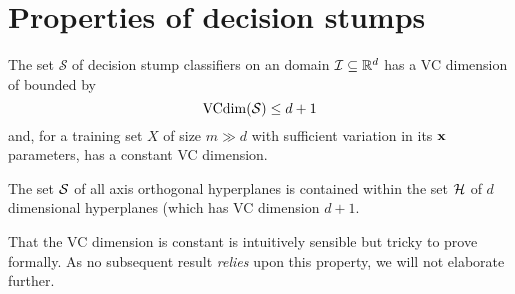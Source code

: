 \section{Properties of decision stumps}

\begin{theorem}
\label{theorem:vcdim stumps}
The set $\mathcal{S}$ of decision stump classifiers on an domain
$\mathcal{I} \subseteq \mathbb{R}^d$ has a VC dimension of bounded by 
%
\begin{equation}
\mathrm{VCdim}(\mathcal{S}) \leq d + 1
\end{equation}
%
and, for a training set $X$ of size $m \gg d$ with sufficient
variation in its $\mathbf{x}$ parameters, has a constant VC dimension.
%
\end{theorem}

\proof The set $\mathcal{S}$ of all axis orthogonal hyperplanes
is contained within the set $\mathcal{H}$ of $d$ dimensional hyperplanes
(which has VC dimension $d+1$.

That the VC dimension is constant is intuitively sensible
but tricky to prove formally.  As no subsequent result \emph{relies}
upon this property, we will not elaborate further.
